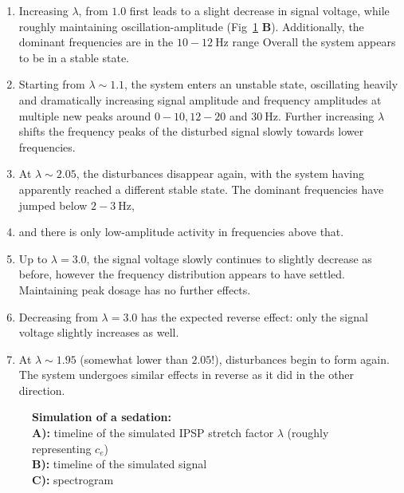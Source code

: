 \begin{enumerate}
    \item Increasing $ \lambda $, from $1.0$ first leads to a slight decrease in signal voltage, while roughly
    maintaining
    oscillation-amplitude (Fig~\ref{fig:sedation_sim_jr} \textbf{B}).
    Additionally, the dominant frequencies are in the $ 10-12 \SI{}{\hertz} $ range
    Overall the system appears to be in a stable state.

    \item Starting from $ \lambda \sim 1.1 $, the system enters an unstable state, oscillating heavily and dramatically
    increasing signal amplitude and frequency amplitudes at multiple new peaks around $0-10, 12-20$ and $
    \SI{30}{\hertz} $.
    Further increasing $\lambda$ shifts the frequency peaks of the disturbed signal slowly towards lower frequencies.

    \item At $\lambda \sim 2.05 $, the disturbances disappear again, with the system having apparently reached a different
    stable state.
    The dominant frequencies have jumped below $2- \SI{3}{\hertz}$,
    \item and there is only low-amplitude activity in frequencies above that.

    \item Up to $\lambda = 3.0$, the signal voltage slowly continues to slightly decrease as before,
    however the frequency distribution appears to have settled.
    Maintaining peak dosage has no further effects.

    \item Decreasing from $\lambda = 3.0$ has the expected reverse effect: only the signal voltage slightly increases
    as well.

    \item At $\lambda \sim 1.95$ (somewhat lower than $2.05$!), disturbances begin to form again.
    The system undergoes similar effects in reverse as it did in the other direction.
\end{enumerate}


\begin{figure}[H]
\togglefalse{drawLocRoc}
\def\simRunName{jr_simple}

\caption{\textbf{Simulation of a sedation:} \\
        \textbf{A):} timeline of the simulated IPSP stretch factor $\lambda$ (roughly representing $c_e$) \\
        \textbf{B):} timeline of the simulated signal \\
        \textbf{C):} spectrogram
}\label{fig:sedation_sim_jr}
\end{figure}

